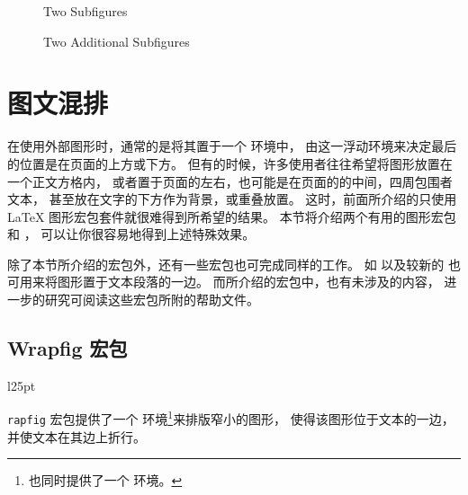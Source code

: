 \begin{figure}
	\centering
	\hspace{1cm}
	\caption{Two Subfigures}
	\label{fig:contfig:one}
\end{figure}
\begin{figure}
	\ContinuedFloat
	\centering
	\hspace{1cm}
	\caption{Two Additional Subfigures}
	\label{fig:contfig:two}
\end{figure}

\section{图文混排}\label{sec:figintext}

在使用外部图形时，通常的是将其置于一个  环境中，
由这一浮动环境来决定最后的位置是在页面的上方或下方。
但有的时候，许多使用者往往希望将图形放置在一个正文方格内，
或者置于页面的左右，也可能是在页面的的中间，四周包围者文本，
甚至放在文字的下方作为背景，或重叠放置。
这时，前面所介绍的只使用 \LaTeX{} 图形宏包套件就很难得到所希望的结果。
本节将介绍两个有用的图形宏包  和 ，
可以让你很容易地得到上述特殊效果。

除了本节所介绍的宏包外，还有一些宏包也可完成同样的工作。
如 \cite{floatflt-doc} 以及较新的\cite{cutwin-doc} 也可用来将图形置于文本段落的一边。
而所介绍的宏包中，也有未涉及的内容，
进一步的研究可阅读这些宏包所附的帮助文件。

\subsection{Wrapfig 宏包}\label{ssec:wrapfig}

\begin{wrapfigure}{l}{25pt}
	\textcolor{blue}{}
\end{wrapfigure}
\noindent \texttt{rapfig} 宏包提供了一个  环境\footnote{
	 也同时提供了一个  环境。}来排版窄小的图形，
使得该图形位于文本的一边，并使文本在其边上折行。

